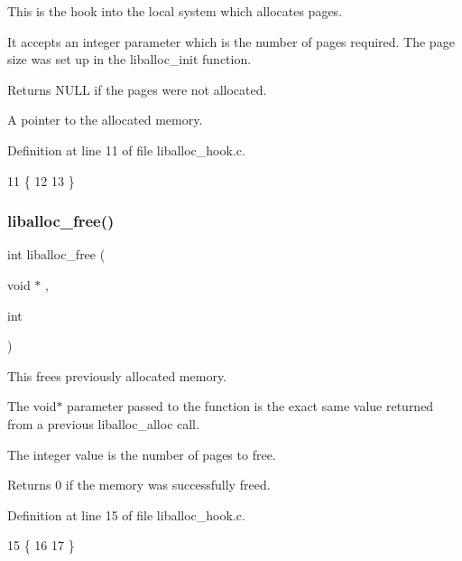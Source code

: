 This is the hook into the local system which allocates pages. 

It accepts an integer parameter which is the number of pages required. The page size was set up in the liballoc\+\_\+init function.

\begin{DoxyReturn}{Returns}
N\+U\+LL if the pages were not allocated. 

A pointer to the allocated memory. 
\end{DoxyReturn}


Definition at line 11 of file liballoc\+\_\+hook.\+c.


\begin{DoxyCode}
11                                 \{
12 
13 \}
\end{DoxyCode}
\mbox{\label{a00038_a1653870893230580e5d605148aa3c37a_a1653870893230580e5d605148aa3c37a}} 
\subsubsection{\texorpdfstring{liballoc\+\_\+free()}{liballoc\_free()}}
{\footnotesize\ttfamily int liballoc\+\_\+free (\begin{DoxyParamCaption}\item[{void $\ast$}]{,  }\item[{int}]{ }\end{DoxyParamCaption})}



This frees previously allocated memory. 

The void$\ast$ parameter passed to the function is the exact same value returned from a previous liballoc\+\_\+alloc call.

The integer value is the number of pages to free.

\begin{DoxyReturn}{Returns}
0 if the memory was successfully freed. 
\end{DoxyReturn}


Definition at line 15 of file liballoc\+\_\+hook.\+c.


\begin{DoxyCode}
15                                         \{
16 
17 \}
\end{DoxyCode}
\mbox{\label{a00038_a8b5670e4594b0b6f8be78fe17f0c3b53_a8b5670e4594b0b6f8be78fe17f0c3b53}} 
